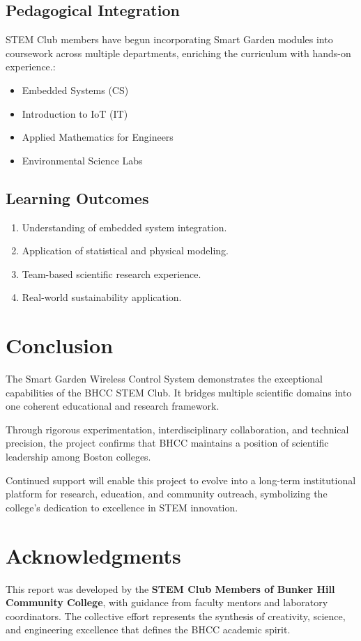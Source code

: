 \documentclass[12pt,a4paper]{article}
\begin{document}
\subsection{Pedagogical Integration}
STEM Club members have begun incorporating Smart Garden modules into coursework across multiple departments, enriching the curriculum with hands-on experience.:
\begin{itemize}
  \item Embedded Systems (CS)
  \item Introduction to IoT (IT)
  \item Applied Mathematics for Engineers
  \item Environmental Science Labs
\end{itemize}

\subsection{Learning Outcomes}
\begin{enumerate}
  \item Understanding of embedded system integration.
  \item Application of statistical and physical modeling.
  \item Team-based scientific research experience.
  \item Real-world sustainability application.
\end{enumerate}

\clearpage
\section{Conclusion}

The Smart Garden Wireless Control System demonstrates the exceptional capabilities of the BHCC STEM Club. It bridges multiple scientific domains into one coherent educational and research framework. 

Through rigorous experimentation, interdisciplinary collaboration, and technical precision, the project confirms that BHCC maintains a position of scientific leadership among Boston colleges.

Continued support will enable this project to evolve into a long-term institutional platform for research, education, and community outreach, symbolizing the college’s dedication to excellence in STEM innovation.

\clearpage
\section*{Acknowledgments}
This report was developed by the \textbf{STEM Club Members of Bunker Hill Community College}, with guidance from faculty mentors and laboratory coordinators. The collective effort represents the synthesis of creativity, science, and engineering excellence that defines the BHCC academic spirit.
\end{document}
